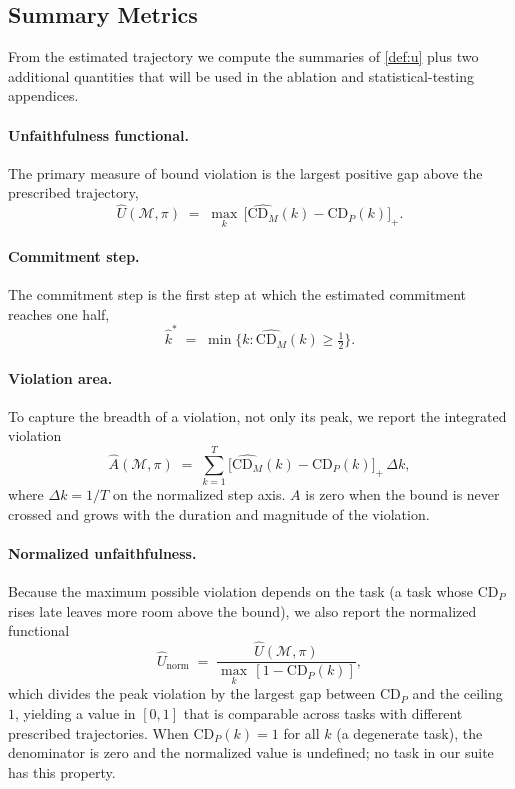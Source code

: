 \documentclass[11pt]{article}
\newcommand{\CDP}{\mathrm{CD}_{P}}
\newcommand{\CDM}{\mathrm{CD}_{M}}
\newcommand{\stepk}{k}
\begin{document}
\subsection{Summary Metrics}
\label{app:metrics-summary}

From the estimated trajectory we compute the summaries of \cref{def:u} plus two
additional quantities that will be used in the ablation and statistical-testing
appendices.

\paragraph{Unfaithfulness functional.}
The primary measure of bound violation is the largest positive gap above the
prescribed trajectory,
\begin{equation}
\label{eq:u-est}
\widehat{U}(\mathcal{M},\pi) \;=\; \max_{\stepk}\,
\bigl[\widehat{\CDM}(\stepk)-\CDP(\stepk)\bigr]_{+}.
\end{equation}

\paragraph{Commitment step.}
The commitment step is the first step at which the estimated commitment reaches
one half,
\begin{equation}
\label{eq:kstar-est}
\widehat{\stepk}^{*} \;=\; \min\{\stepk:\widehat{\CDM}(\stepk)\ge\tfrac12\}.
\end{equation}

\paragraph{Violation area.}
To capture the breadth of a violation, not only its peak, we report the
integrated violation
\begin{equation}
\label{eq:auc-violation}
\widehat{A}(\mathcal{M},\pi) \;=\;
\sum_{\stepk=1}^{T}\bigl[\widehat{\CDM}(\stepk)-\CDP(\stepk)\bigr]_{+}\,
\Delta\stepk,
\end{equation}
where $\Delta\stepk=1/T$ on the normalized step axis. $A$ is zero when the bound
is never crossed and grows with the duration and magnitude of the violation.

\paragraph{Normalized unfaithfulness.}
Because the maximum possible violation depends on the task (a task whose
$\CDP$ rises late leaves more room above the bound), we also report the
normalized functional
\begin{equation}
\label{eq:u-norm}
\widehat{U}_{\mathrm{norm}} \;=\;
\frac{\widehat{U}(\mathcal{M},\pi)}
     {\max_{\stepk}\,[1-\CDP(\stepk)]},
\end{equation}
which divides the peak violation by the largest gap between $\CDP$ and the
ceiling $1$, yielding a value in $[0,1]$ that is comparable across tasks with
different prescribed trajectories. When $\CDP(\stepk)=1$ for all $\stepk$ (a
degenerate task), the denominator is zero and the normalized value is undefined;
no task in our suite has this property.
\end{document}
